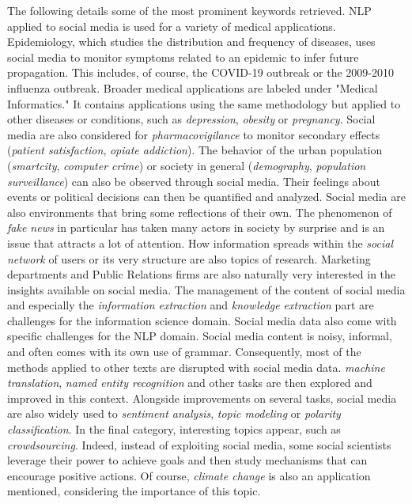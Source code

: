 The following details some of the most prominent keywords retrieved.
NLP applied to social media is used for a variety of medical applications.
Epidemiology, which studies the distribution and frequency of diseases, uses social media to monitor symptoms related to an epidemic to infer future propagation.
This includes, of course, the COVID-19 outbreak or the 2009-2010 influenza outbreak.
Broader medical applications are labeled under "Medical Informatics."
It contains applications using the same methodology but applied to other diseases or conditions, such as \emph{depression}, \emph{obesity} or \emph{pregnancy}.
Social media are also considered for \emph{pharmacovigilance} to monitor secondary effects (\emph{patient satisfaction}, \emph{opiate addiction}).
The behavior of the urban population (\emph{smartcity}, \emph{computer crime}) or society in general (\emph{demography}, \emph{population surveillance}) can also be observed through social media.
Their feelings about events or political decisions can then be quantified and analyzed.
Social media are also environments that bring some reflections of their own.
The phenomenon of \emph{fake news} in particular has taken many actors in society by surprise and is an issue that attracts a lot of attention.
How information spreads within the \emph{social network} of users or its very structure are also topics of research.
Marketing departments and Public Relations firms are also naturally very interested in the insights available on social media.
The management of the content of social media and especially the \emph{information extraction} and \emph{knowledge extraction} part
are challenges for the information science domain.
Social media data also come with specific challenges for the NLP domain.
Social media content is noisy, informal, and often comes with its own use of grammar.
Consequently, most of the methods applied to other texts are disrupted with social media data.
\emph{machine translation}, \emph{named entity recognition} and other tasks are then explored and improved in this context.
Alongside improvements on several tasks, social media are also widely used to \emph{sentiment analysis}, \emph{topic modeling} or \emph{polarity classification}.
In the final category, interesting topics appear, such as \emph{crowdsourcing}.
Indeed, instead of exploiting social media, some social scientists leverage their power to achieve goals and then study mechanisms that can encourage positive actions.
Of course, \emph{climate change} is also an application mentioned, considering the importance of this topic.

